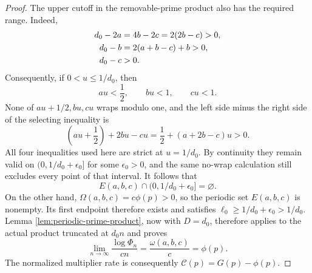 \documentclass[11pt,reqno,letterpaper]{amsart}
\numberwithin{equation}{section}
\theoremstyle{definition}
\theoremstyle{remark}
\begin{document}
\begin{proof}
The upper cutoff in the removable-prime product also has the required
range.  Indeed,
\begin{align}
 d_0-2a&=4b-2c=2(2b-c)>0,\notag\\
 d_0-b&=2(a+b-c)+b>0,\label{eq:general-cutoff-margins}\\
 d_0-c&>0.\notag
\end{align}
Consequently, if \(0<u\leq1/d_0\), then
\[
 au<\frac12,\qquad bu<1,\qquad cu<1.
\]
None of \(au+1/2,bu,cu\) wraps modulo one, and the left side minus the
right side of the selecting inequality is
\begin{equation}\label{eq:general-initial-gap}
 \left(au+\frac12\right)+2bu-cu
 =\frac12+(a+2b-c)u>0.
\end{equation}
All four inequalities used here are strict at \(u=1/d_0\).  By
continuity they remain valid on
\((0,1/d_0+\epsilon_0]\) for some \(\epsilon_0>0\), and the same
no-wrap calculation still excludes every point of that interval.
It follows that
\[
 E(a,b,c)\cap(0,1/d_0+\epsilon_0]=\varnothing.
\]
On the other hand, \(\Omega(a,b,c)=c\phi(p)>0\), so the periodic set
\(E(a,b,c)\) is nonempty.  Its first endpoint therefore exists and
satisfies \(\ell_0\geq1/d_0+\epsilon_0>1/d_0\).  Lemma
\ref{lem:periodic-prime-product}, now with \(D=d_0\), therefore applies
to the actual product truncated at \(d_0n\) and proves
\begin{equation}\label{eq:general-prime-saving-bridge}
 \lim_{n\to\infty}\frac{\log\Phi_n}{cn}
 =\frac{\omega(a,b,c)}c=\phi(p).
\end{equation}
The normalized multiplier rate is consequently
\(\mathcal C(p)=G(p)-\phi(p)\).


\end{proof}
\end{document}
